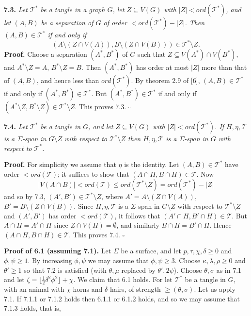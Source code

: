 \textbf{7.3.} \textit{Let $\mathcal{T}^*$ be a tangle in a graph $G$, let $Z \subseteq V(G)$ with $|Z| < ord(\mathcal{T}^*)$, and let $(A, B)$ be a separation of $G$ of order $< ord(\mathcal{T}^*) - |Z|$. Then $(A, B) \in \mathcal{T}^*$ if and only if}
\begin{equation*}
(A \setminus (Z \cap V(A)), B \setminus (Z \cap V(B))) \in \mathcal{T}^* \setminus Z.
\end{equation*}
\textbf{Proof.} Choose a separation $(A^*, B^*)$ of $G$ such that $Z \subseteq V(A^*) \cap V(B^*)$, and $A^* \setminus Z = A$, $B^* \setminus Z = B$. Then $(A^*, B^*)$ has order at most $|Z|$ more than that of $(A, B)$, and hence less than $ord(\mathcal{T}^*)$. By theorem 2.9 of [6], $(A, B) \in \mathcal{T}^*$ if and only if $(A^*, B^*) \in \mathcal{T}^*$. But $(A^*, B^*) \in \mathcal{T}^*$ if and only if $(A^* \setminus Z, B^* \setminus Z) \in \mathcal{T}^* \setminus Z$. This proves 7.3. $\square$

\textbf{7.4.} \textit{Let $\mathcal{T}^*$ be a tangle in $G$, and let $Z \subseteq V(G)$ with $|Z| < ord(\mathcal{T}^*)$. If $H, \eta, \mathcal{T}$ is a $\Sigma$-span in $G \setminus Z$ with respect to $\mathcal{T}^* \setminus Z$ then $H, \eta, \mathcal{T}$ is a $\Sigma$-span in $G$ with respect to $\mathcal{T}^*$.}

\textbf{Proof.} For simplicity we assume that $\eta$ is the identity. Let $(A, B) \in \mathcal{T}^*$ have order $< ord(\mathcal{T})$; it suffices to show that $(A \cap H, B \cap H) \in \mathcal{T}$. Now
\begin{equation*}
|V(A \cap B)| < ord(\mathcal{T}) \le ord(\mathcal{T}^* \setminus Z) = ord(\mathcal{T}^*) - |Z|
\end{equation*}
and so by 7.3, $(A', B') \in \mathcal{T}^* \setminus Z$, where $A' = A \setminus (Z \cap V(A))$, $B' = B \setminus (Z \cap V(B))$. Since $H, \eta, \mathcal{T}$ is a $\Sigma$-span in $G \setminus Z$ with respect to $\mathcal{T}^* \setminus Z$ and $(A', B')$ has order $< ord(\mathcal{T})$, it follows that $(A' \cap H, B' \cap H) \in \mathcal{T}$. But $A \cap H = A' \cap H$ since $Z \cap V(H) = \emptyset$, and similarly $B \cap H = B' \cap H$. Hence $(A \cap H, B \cap H) \in \mathcal{T}$. This proves 7.4. $\square$

\textbf{Proof of 6.1 (assuming 7.1).} Let $\Sigma$ be a surface, and let $p, \tau, \chi, \delta \ge 0$ and $\phi, \psi \ge 1$. By increasing $\phi, \psi$ we may assume that $\phi, \psi \ge 3$. Choose $\kappa, \lambda, \rho \ge 0$ and $\theta' \ge 1$ so that 7.2 is satisfied (with $\theta, \mu$ replaced by $\theta', 2\psi$). Choose $\theta, \sigma$ as in 7.1 and let $\zeta = \lfloor \frac{1}{2}\delta^2 \phi^2 \rfloor + \chi$. We claim that 6.1 holds. For let $\mathcal{T}^*$ be a tangle in $G$, with an animal with $\chi$ horns and $\delta$ hairs, of strength $\ge (\theta, \sigma)$. Let us apply 7.1. If 7.1.1 or 7.1.2 holds then 6.1.1 or 6.1.2 holds, and so we may assume that 7.1.3 holds, that is,

